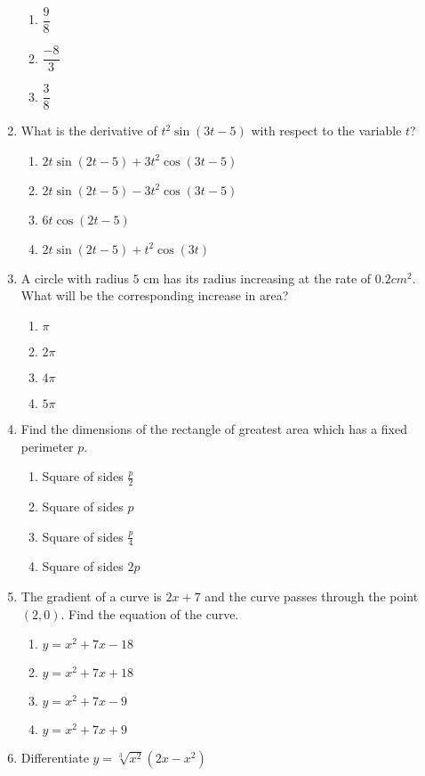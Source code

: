 \begin{multicols}{2}
\begin{enumerate}[label={\arabic*.}]
\begin{enumerate}[label={\Alph*.}]
	\item \(\dfrac{9}{8}\)
	\item \(\dfrac{-8}{3}\)
	\item \(\dfrac{3}{8}\)
	\end{enumerate}
\item What is the derivative of \({t}^{2}\sin(3t-5)\) with respect to the variable \(t\)?
	\begin{enumerate}[label={\Alph*.}]
	\item \(2t \sin(2t-5) + 3{t}^2\cos(3t-5)\)
	\item \(2t \sin(2t-5) - 3{t}^2\cos(3t-5)\)
	\item \(6t\cos(2t-5)\)
	\item \(2t \sin(2t-5) + t^2\cos(3t)\)
	\end{enumerate}
\item A circle with radius \(5\) cm has its radius increasing at the rate of \(0.2 {cm}^2\). What will be the corresponding increase in area?
	\begin{enumerate}[label={\Alph*.}]
	\item \(\pi\)
	\item \(2\pi\)
	\item \(4\pi\)
	\item \(5\pi\)
	\end{enumerate}
\item Find the dimensions of the rectangle of greatest area which has a fixed perimeter \(p\).
	\begin{enumerate}[label={\Alph*.}]
	\item Square of sides \(\frac{p}{2}\)
	\item Square of sides \(p\)
	\item Square of sides \(\frac{p}{4}\)
	\item Square of sides \(2p\)
	\end{enumerate}
\item The gradient of a curve is \(2x+7\) and the curve passes through the point \((2, 0)\). Find the equation of the curve.
	\begin{enumerate}[label={\Alph*.}]
	\item \(y = {x}^{2}+7x-18\)
	\item \(y = {x}^{2}+7x+18\)
	\item \(y = {x}^{2}+7x-9\)
	\item \(y = {x}^{2}+7x+9\)
	\end{enumerate}
\item Differentiate \(y = \sqrt[3]{{x}^{2}}(2x-{x}^{2})\)
	\begin{enumerate}[label={\Alph*.}]

\end{enumerate}
\end{enumerate}
\end{multicols}
